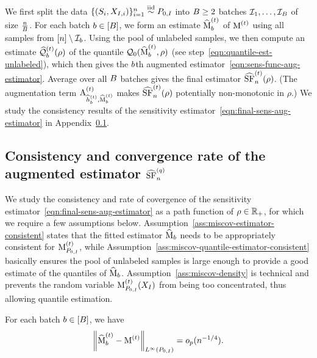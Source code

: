 We first split the data $\{ (S_i, X_{I, i}) \}_{i=1}^n \stackrel{\rm iid}{\sim}
P_{0,I}$ into $B \ge 2$ batches $\mathcal{I}_1, \dots, \mathcal{I}_B$ of
size $\frac{n}{B}$.  For each batch $b \in [B]$, we form an
estimate $\widehat{\operatorname*{M}}^{(t)}_b$ of
${\operatorname*{M}}^{(t)}$ using all samples from $[n] \setminus
\mathcal{I}_b$.  Using the pool of unlabeled samples, we then compute an
estimate $\widehat{\mathcal{Q}}_b^{(t)}(\rho)$ of the quantile
$\mathcal{Q}_0(\widehat{\operatorname*{M}}^{(t)}_b,\rho)$ (see
step~\eqref{eqn:quantile-est-unlabeled}), which then gives the $b$th
augmented estimator~\eqref{eqn:sens-func-aug-estimator}.  Average over all
$B$ batches gives the final estimator
$\widehat{\operatorname*{SF}}^{(t)}_n(\rho)$.  (The augmentation term
$\textrm{A}^{(t)}_{\widehat{h}^{(t)}_b, \widehat{\operatorname*{M}}^{(t)}_b}$ makes
$\widehat{\operatorname*{SF}}^{(t)}_n(\rho)$ potentially non-monotonic in
$\rho$.) We study the consistency results of the sensitivity estimator~\eqref{eqn:final-sens-aug-estimator} in Appendix~\ref{sec:sensitivity_consistency}.

\subsection{Consistency and convergence rate of the augmented estimator $ \widehat{\operatorname*{SF}}^{(q)}_n$}
\label{sec:sensitivity_consistency}
We study the consistency and rate of covergence of the sensitivity
estimator~\eqref{eqn:final-sens-aug-estimator} as a path function of $\rho
\in \mathbb{R}_+$, for which we require a few assumptions below.
Assumption~\ref{ass:miscov-estimator-consistent} states that the fitted
estimator $\widehat{\operatorname*{M}}_b$ needs to be appropriately consistent for
${\operatorname*{M}}_{P_{0,I}}^{(t)}$, while Assumption~\ref{ass:miscov-quantile-estimator-consistent}
basically ensures the pool of unlabeled samples is large enough to provide a
good estimate of the quantiles of $\widehat{\operatorname*{M}}_b$.
Assumption~\ref{ass:miscov-density} is technical and prevents
the random variable ${\operatorname*{M}}_{P_{0,I}}^{(t)}(X_I)$ from being too concentrated,
thus allowing quantile estimation.
%

\begin{assumption}
  \label{ass:miscov-estimator-consistent}
  For each batch $b \in [B]$,
  we have
  \begin{align*}
    \left\|{\widehat{\operatorname*{M}}^{(t)}_b- {\operatorname*{M}}^{(t)}}\right\|_{L^\infty(P_{0,I})} = o_p(n^{-1/4}).
  \end{align*}
\end{assumption}

